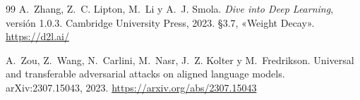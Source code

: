 \begin{thebibliography}{99}
A.~Zhang, Z.~C. Lipton, M.~Li y A.~J. Smola.
\newblock \emph{Dive into Deep Learning}, versión 1.0.3.
\newblock Cambridge University Press, 2023.
\newblock §3.7, «Weight Decay».
\newblock \url{https://d2l.ai/}

A.~Zou, Z.~Wang, N.~Carlini, M.~Nasr, J.~Z. Kolter y M.~Fredrikson.
\newblock Universal and transferable adversarial attacks on aligned language models.
\newblock arXiv:2307.15043, 2023.
\newblock \url{https://arxiv.org/abs/2307.15043}

\end{thebibliography}

